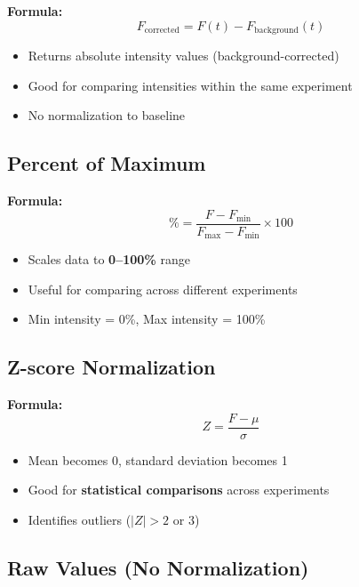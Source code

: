 \documentclass[11pt,a4paper]{article}
\begin{document}
\textbf{Formula:}
\begin{equation}
F_{\text{corrected}} = F(t) - F_{\text{background}}(t)
\end{equation}

\begin{itemize}
    \item Returns absolute intensity values (background-corrected)
    \item Good for comparing intensities within the same experiment
    \item No normalization to baseline
\end{itemize}

\subsection{Percent of Maximum}

\textbf{Formula:}
\begin{equation}
\% = \frac{F - F_{\min}}{F_{\max} - F_{\min}} \times 100
\end{equation}

\begin{itemize}
    \item Scales data to \textbf{0--100\%} range
    \item Useful for comparing across different experiments
    \item Min intensity = 0\%, Max intensity = 100\%
\end{itemize}

\subsection{Z-score Normalization}

\textbf{Formula:}
\begin{equation}
Z = \frac{F - \mu}{\sigma}
\end{equation}

\begin{itemize}
    \item Mean becomes 0, standard deviation becomes 1
    \item Good for \textbf{statistical comparisons} across experiments
    \item Identifies outliers ($|Z| > 2$ or 3)
\end{itemize}

\subsection{Raw Values (No Normalization)}
\end{document}
